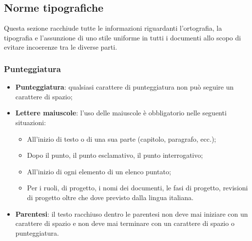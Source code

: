 \subsection{Norme tipografiche}
Questa sezione racchiude tutte le informazioni riguardanti l'ortografia, la tipografia e l'assunzione di uno stile uniforme in tutti i documenti allo scopo di evitare incoerenze tra le diverse parti.

\subsubsection{Punteggiatura}
\begin{itemize}
	\item \textbf{Punteggiatura}: qualsiasi carattere di punteggiatura non può seguire un carattere di spazio;
	\item \textbf{Lettere maiuscole}: l'uso delle maiuscole è obbligatorio nelle seguenti situazioni:
	\begin{itemize}
		\item All'inizio di testo o di una sua parte (capitolo, paragrafo, ecc.);
		\item Dopo il punto, il punto esclamativo, il punto interrogativo;
		\item All'inizio di ogni elemento di un elenco puntato;
		\item Per i ruoli, di progetto, i nomi dei documenti, le fasi di progetto, revisioni di progetto oltre che dove previsto dalla lingua italiana.
	\end{itemize}
	\item \textbf{Parentesi}: il testo racchiuso dentro le parentesi non deve mai iniziare con un carattere di spazio e non deve mai terminare con un carattere di spazio o punteggiatura.
\end{itemize}	

